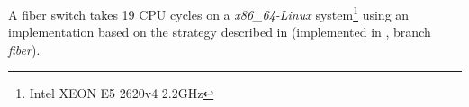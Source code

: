 
A fiber switch takes 19 CPU cycles on a \emph{x86\_64-Linux}
system\footnote{Intel XEON E5 2620v4 2.2GHz} using an implementation based on
the strategy described in  (implemented in
\bcontext\cite{bcontext}, branch \emph{fiber}).
